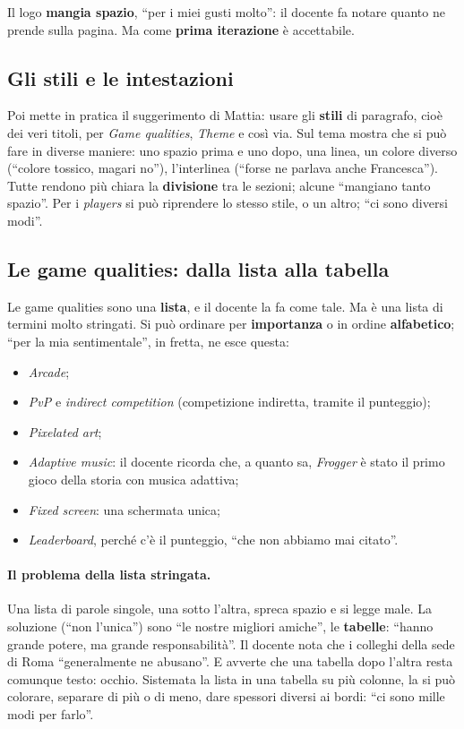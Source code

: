 Il logo \textbf{mangia spazio}, ``per i miei gusti molto'': il docente fa
notare quanto ne prende sulla pagina. Ma come \textbf{prima iterazione} è
accettabile.

\subsection{Gli stili e le intestazioni}

Poi mette in pratica il suggerimento di Mattia: usare gli \textbf{stili} di
paragrafo, cioè dei veri titoli, per \emph{Game qualities}, \emph{Theme} e
così via. Sul tema mostra che si può fare in diverse maniere: uno spazio prima
e uno dopo, una linea, un colore diverso (``colore tossico, magari no''),
l'interlinea (``forse ne parlava anche Francesca''). Tutte rendono più
chiara la \textbf{divisione} tra le sezioni; alcune ``mangiano tanto
spazio''. Per i \emph{players} si può riprendere lo stesso stile, o un altro;
``ci sono diversi modi''.

\subsection{Le game qualities: dalla lista alla tabella}

Le game qualities sono una \textbf{lista}, e il docente la fa come tale. Ma
è una lista di termini molto stringati. Si può ordinare per
\textbf{importanza} o in ordine \textbf{alfabetico}; ``per la mia
sentimentale'', in fretta, ne esce questa:
\begin{itemize}
  \item \emph{Arcade};
  \item \emph{PvP} e \emph{indirect competition} (competizione indiretta,
        tramite il punteggio);
  \item \emph{Pixelated art};
  \item \emph{Adaptive music}: il docente ricorda che, a quanto sa,
        \emph{Frogger} è stato il primo gioco della storia con musica
        adattiva;
  \item \emph{Fixed screen}: una schermata unica;
  \item \emph{Leaderboard}, perché c'è il punteggio, ``che non abbiamo mai
        citato''.
\end{itemize}

\paragraph{Il problema della lista stringata.} Una lista di parole singole,
una sotto l'altra, spreca spazio e si legge male. La soluzione (``non
l'unica'') sono ``le nostre migliori amiche'', le \textbf{tabelle}: ``hanno
grande potere, ma grande responsabilità''. Il docente nota che i colleghi
della sede di Roma ``generalmente ne abusano''. E avverte che una tabella dopo
l'altra resta comunque testo: occhio. Sistemata la lista in una tabella su più
colonne, la si può colorare, separare di più o di meno, dare spessori diversi
ai bordi: ``ci sono mille modi per farlo''.

